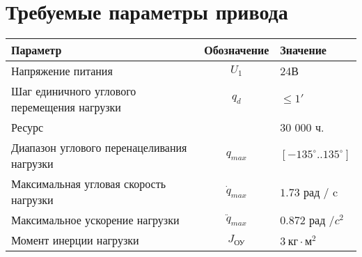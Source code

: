 \section{Требуемые параметры привода}

\begin{tabular}{|l|c|l|}
    \hline
    Параметр                                    & Обозначение      & Значение                   \\
    \hline
    Напряжение питания                          & $U_1$            & 24В                        \\
    Шаг единичного углового перемещения нагрузки& $q_d$            & $ \le 1' $                 \\
    Ресурс                                      &                  & 30 000 ч.                  \\
    Диапазон углового перенацеливания нагрузки  & $q_{max}$        & $[-135^\circ .. 135^\circ] $ \\
    Максимальная угловая скорость нагрузки      & $\dot{q}_{max}$  & $1.73$ рад / c             \\
    Максимальное ускорение нагрузки             & $\ddot{q}_{max}$ & $0.872$ рад /$c^2$         \\
    Момент инерции нагрузки                     & $J_{\text{ОУ}}$  & $3 ~\text{кг} \cdot \text{м}^2 $          \\
    \hline
\end{tabular}

\endinput
